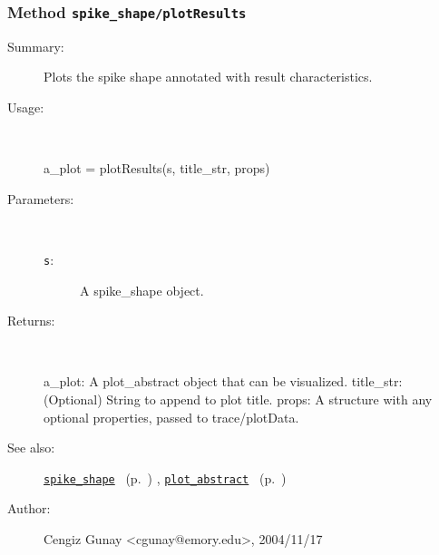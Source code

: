\subsubsection[Method \texttt{plotResults}]{Method \texttt{spike\_shape/plotResults}}%
%
\label{ref_spike_shape__plotResults}%
\hypertarget{ref_spike_shape__plotResults}{}%
\begin{description}
\item[Summary:]Plots the spike shape annotated with result characteristics.
%
\item[Usage:]~%
\begin{lyxcode}%
a\_plot = plotResults(s, title\_str, props)
%
\end{lyxcode}%
%
%
\item[Parameters:]~
\begin{description}%
\item[\texttt{s}:]
 A spike\_shape object.
\end{description}%
%
\item[Returns:
]~

	a\_plot: A plot\_abstract object that can be visualized.
	title\_str: (Optional) String to append to plot title.
	props: A structure with any optional properties, passed to trace/plotData.
%
%
\item[See also:]%
\hyperlink{ref_spike_shape}{\texttt{spike\_shape}}%
\ (p.~\pageref{ref_spike_shape})%
%
, \hyperlink{ref_plot_abstract}{\texttt{plot\_abstract}}%
\ (p.~\pageref{ref_plot_abstract})%
%
%
\item[Author:]%
Cengiz Gunay <cgunay@emory.edu>, 2004/11/17
%
\end{description}
\methodline%
